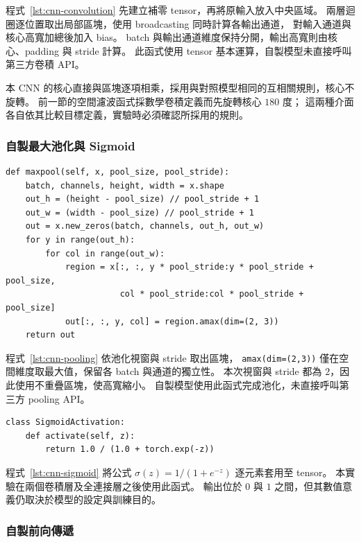 程式~\ref{lst:cnn-convolution} 先建立補零 tensor，再將原輸入放入中央區域。
兩層迴圈逐位置取出局部區塊，使用 broadcasting 同時計算各輸出通道，
對輸入通道與核心高寬加總後加入 bias。
batch 與輸出通道維度保持分開，輸出高寬則由核心、padding 與 stride 計算。
此函式使用 tensor 基本運算，自製模型未直接呼叫第三方卷積 API。

本 CNN 的核心直接與區塊逐項相乘，採用與對照模型相同的互相關規則，核心不旋轉。
前一節的空間濾波函式採數學卷積定義而先旋轉核心 $180$ 度；
這兩種介面各自依其比較目標定義，實驗時必須確認所採用的規則。

\subsubsection{自製最大池化與 Sigmoid}

\begin{lstlisting}[caption={自製最大池化},label={lst:cnn-pooling}]
def maxpool(self, x, pool_size, pool_stride):
    batch, channels, height, width = x.shape
    out_h = (height - pool_size) // pool_stride + 1
    out_w = (width - pool_size) // pool_stride + 1
    out = x.new_zeros(batch, channels, out_h, out_w)
    for y in range(out_h):
        for col in range(out_w):
            region = x[:, :, y * pool_stride:y * pool_stride + pool_size,
                       col * pool_stride:col * pool_stride + pool_size]
            out[:, :, y, col] = region.amax(dim=(2, 3))
    return out
\end{lstlisting}

程式~\ref{lst:cnn-pooling} 依池化視窗與 stride 取出區塊，
\texttt{amax(dim=(2,3))} 僅在空間維度取最大值，保留各 batch 與通道的獨立性。
本次視窗與 stride 都為 $2$，因此使用不重疊區塊，使高寬縮小。
自製模型使用此函式完成池化，未直接呼叫第三方 pooling API。

\begin{lstlisting}[caption={自行實作 Sigmoid},label={lst:cnn-sigmoid}]
class SigmoidActivation:
    def activate(self, z):
        return 1.0 / (1.0 + torch.exp(-z))
\end{lstlisting}

程式~\ref{lst:cnn-sigmoid} 將公式 $\sigma(z)=1/(1+e^{-z})$ 逐元素套用至 tensor。
本實驗在兩個卷積層及全連接層之後使用此函式。
輸出位於 $0$ 與 $1$ 之間，但其數值意義仍取決於模型的設定與訓練目的。

\subsubsection{自製前向傳遞}

